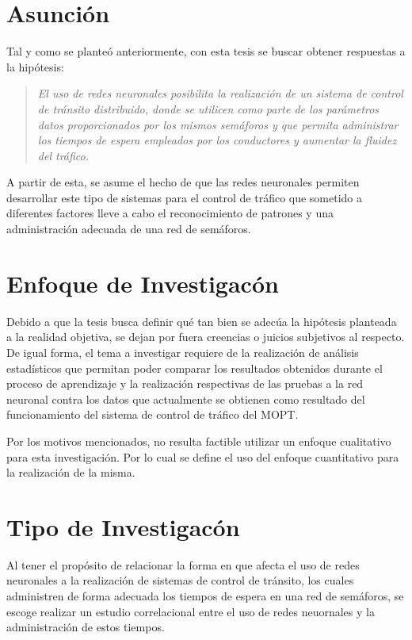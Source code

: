 \section{Asunci\'{o}n}

Tal y como se plante\'{o} anteriormente, con esta tesis se buscar obtener
respuestas a la hip\'{o}tesis:

\begin{quote}
	\textit{El uso de redes neuronales posibilita la realizaci\'{o}n de un sistema
de control de tr\'{a}nsito distribuido, donde se utilicen como parte de los par\'{a}metros datos
proporcionados por los mismos sem\'{a}foros y que permita administrar los tiempos de
espera empleados por los conductores y aumentar la fluidez del tr\'{a}fico.}
\end{quote}

	A partir de esta, se asume el hecho de que las redes neuronales permiten
desarrollar este tipo de sistemas para el control de tr\'{a}fico que sometido a
diferentes factores lleve a cabo el reconocimiento de patrones y una
administraci\'{o}n adecuada de una red de sem\'{a}foros.

\section{Enfoque de Investigac\'{o}n}

	
	Debido a que la tesis busca definir qu\'{e} tan bien se adec\'{u}a la
	hip\'{o}tesis planteada a la realidad objetiva, se dejan por fuera creencias o juicios
subjetivos al respecto. De igual forma, el tema a investigar requiere de la
realizaci\'{o}n de an\'{a}lisis estad\'{i}sticos que permitan poder comparar
los resultados obtenidos durante el proceso de aprendizaje y la realizaci\'{o}n
respectivas de las pruebas a la red neuronal contra los datos que actualmente
se obtienen como resultado del funcionamiento del sistema de control de
tr\'{a}fico del MOPT.
	
	Por los motivos mencionados, no resulta factible utilizar un enfoque
cualitativo para esta investigaci\'{o}n. Por lo cual se define el uso del
enfoque cuantitativo para la realizaci\'{o}n de la misma.

\section{Tipo de Investigac\'{o}n}


	Al tener el prop\'{o}sito de relacionar la forma en que afecta el uso de
redes neuronales a la realizaci\'{o}n de sistemas de control de tr\'{a}nsito,
los cuales administren de forma adecuada los tiempos de espera en una red
de sem\'{a}foros, se escoge realizar un estudio correlacional entre el uso de
redes neuornales y la administraci\'{o}n de estos tiempos.

